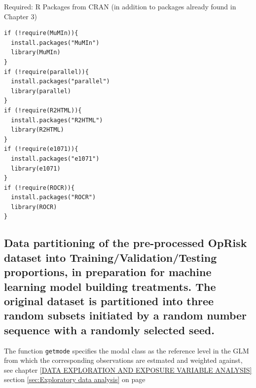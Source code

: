 \documentclass{DissertateUSU}
\begin{document}
\singlespace

Required: R Packages from CRAN (in addition to packages already found in
Chapter 3)

\small

\begin{verbatim}
if (!require(MuMIn)){
  install.packages("MuMIn")
  library(MuMIn)
}
if (!require(parallel)){
  install.packages("parallel")
  library(parallel)
}
if (!require(R2HTML)){
  install.packages("R2HTML")
  library(R2HTML)
}
if (!require(e1071)){
  install.packages("e1071")
  library(e1071)
}
if (!require(ROCR)){
  install.packages("ROCR")
  library(ROCR)
}
\end{verbatim}

\normalsize

\subsection{Data partitioning of the pre-processed OpRisk dataset into Training/Validation/Testing proportions, in preparation for machine learning model building treatments. The original dataset is partitioned into three random subsets initiated by a random number sequence with a randomly selected seed.}
\label{ssec:Data Training/Validation/Testing}

The function \texttt{getmode} specifies the modal class as the reference
level in the GLM from which the corresponding observations are estmated
and weighted against, see chapter
\ref{DATA EXPLORATION AND EXPOSURE VARIABLE ANALYSIS} section
\ref{sec:Exploratory data analysis} on page
\pageref{sec:Exploratory data analysis}

\small
\end{document}

